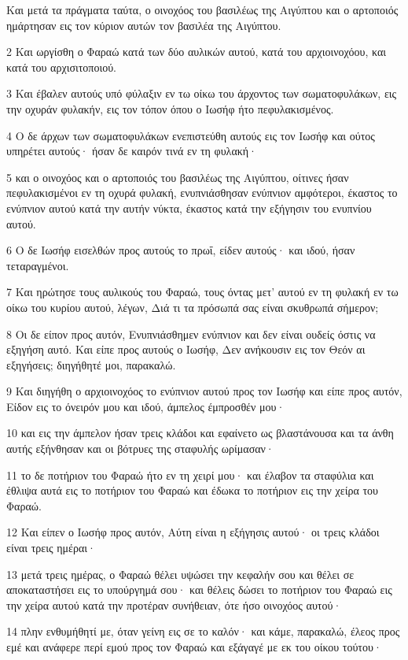 \par Και μετά τα πράγματα ταύτα, ο οινοχόος του βασιλέως της Αιγύπτου και ο αρτοποιός ημάρτησαν εις τον κύριον αυτών τον βασιλέα της Αιγύπτου.
\par 2 Και ωργίσθη ο Φαραώ κατά των δύο αυλικών αυτού, κατά του αρχιοινοχόου, και κατά του αρχισιτοποιού.
\par 3 Και έβαλεν αυτούς υπό φύλαξιν εν τω οίκω του άρχοντος των σωματοφυλάκων, εις την οχυράν φυλακήν, εις τον τόπον όπου ο Ιωσήφ ήτο πεφυλακισμένος.
\par 4 Ο δε άρχων των σωματοφυλάκων ενεπιστεύθη αυτούς εις τον Ιωσήφ και ούτος υπηρέτει αυτούς· ήσαν δε καιρόν τινά εν τη φυλακή·
\par 5 και ο οινοχόος και ο αρτοποιός του βασιλέως της Αιγύπτου, οίτινες ήσαν πεφυλακισμένοι εν τη οχυρά φυλακή, ενυπνιάσθησαν ενύπνιον αμφότεροι, έκαστος το ενύπνιον αυτού κατά την αυτήν νύκτα, έκαστος κατά την εξήγησιν του ενυπνίου αυτού.
\par 6 Ο δε Ιωσήφ εισελθών προς αυτούς το πρωΐ, είδεν αυτούς· και ιδού, ήσαν τεταραγμένοι.
\par 7 Και ηρώτησε τους αυλικούς του Φαραώ, τους όντας μετ' αυτού εν τη φυλακή εν τω οίκω του κυρίου αυτού, λέγων, Διά τι τα πρόσωπά σας είναι σκυθρωπά σήμερον;
\par 8 Οι δε είπον προς αυτόν, Ενυπνιάσθημεν ενύπνιον και δεν είναι ουδείς όστις να εξηγήση αυτό. Και είπε προς αυτούς ο Ιωσήφ, Δεν ανήκουσιν εις τον Θεόν αι εξηγήσεις; διηγήθητέ μοι, παρακαλώ.
\par 9 Και διηγήθη ο αρχιοινοχόος το ενύπνιον αυτού προς τον Ιωσήφ και είπε προς αυτόν, Είδον εις το όνειρόν μου και ιδού, άμπελος έμπροσθέν μου·
\par 10 και εις την άμπελον ήσαν τρεις κλάδοι και εφαίνετο ως βλαστάνουσα και τα άνθη αυτής εξήνθησαν και οι βότρυες της σταφυλής ωρίμασαν·
\par 11 το δε ποτήριον του Φαραώ ήτο εν τη χειρί μου· και έλαβον τα σταφύλια και έθλιψα αυτά εις το ποτήριον του Φαραώ και έδωκα το ποτήριον εις την χείρα του Φαραώ.
\par 12 Και είπεν ο Ιωσήφ προς αυτόν, Αύτη είναι η εξήγησις αυτού· οι τρεις κλάδοι είναι τρεις ημέραι·
\par 13 μετά τρεις ημέρας, ο Φαραώ θέλει υψώσει την κεφαλήν σου και θέλει σε αποκαταστήσει εις το υπούργημά σου· και θέλεις δώσει το ποτήριον του Φαραώ εις την χείρα αυτού κατά την προτέραν συνήθειαν, ότε ήσο οινοχόος αυτού·
\par 14 πλην ενθυμήθητί με, όταν γείνη εις σε το καλόν· και κάμε, παρακαλώ, έλεος προς εμέ και ανάφερε περί εμού προς τον Φαραώ και εξάγαγέ με εκ του οίκου τούτου·
